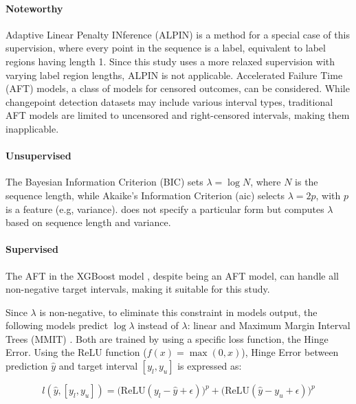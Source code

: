 \documentclass[12pt]{article}
\begin{document}
\paragraph{Noteworthy} Adaptive Linear Penalty INference (ALPIN) \citep{truong17} is a method for a special case of this supervision, where every point in the sequence is a label, equivalent to label regions having length 1.
Since this study uses a more relaxed supervision with varying label region lengths, ALPIN is not applicable.
Accelerated Failure Time (AFT) models, a class of models for censored outcomes, can be considered. 
While changepoint detection datasets may include various interval types, traditional AFT models \citep{aft_cai2009regularized, aft_huang2006regularized, rf, svm} are limited to uncensored and right-censored intervals, making them inapplicable.

\paragraph{Unsupervised}
The Bayesian Information Criterion (BIC) \citep{bic} sets \(\lambda = \log N\), where \(N\) is the sequence length, while Akaike's Information Criterion (aic) \citep{aic} selects \(\lambda = 2p\), with \(p\) is a feature (e.g, variance). 
\citet{lavielle05} does not specify a particular form but computes \(\lambda\) based on sequence length and variance.


\paragraph{Supervised}
The AFT in the XGBoost model \citep{aft_xgboost}, despite being an AFT model, can handle all non-negative target intervals, making it suitable for this study.

Since \(\lambda\) is non-negative, to eliminate this constraint in models output, the following models predict \(\log \lambda\) instead of \(\lambda\): linear \citep{rigaill:13} and Maximum Margin Interval Trees (MMIT) \citep{mmit}. 
Both are trained by using a specific loss function, the Hinge Error. 
Using the ReLU function \big(\(f(x) = \max(0,x)\)\big), Hinge Error between prediction $\hat{y}$ and target interval $[y_l, y_u]$ is expressed as:

\begin{equation}\label{loss_function}
l(\hat{y}, [y_l, y_u]) = \big( \text{ReLU}(y_l - \hat{y} + \epsilon)\big)^p + \big(\text{ReLU}(\hat{y} - y_{u} + \epsilon) \big)^p
\end{equation}
\end{document}
